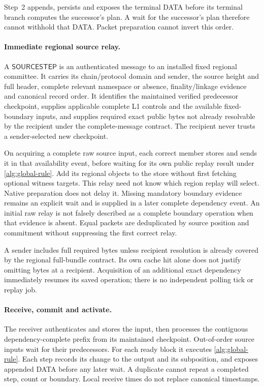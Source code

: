 \documentclass[11pt,a4paper]{article}
\newcommand{\tagg}[1]{\ensuremath{\mathsf{#1}}}
\newcounter{protocol}
\begin{document}
Step~2 appends, persists and exposes the terminal DATA before its
terminal branch computes the successor's plan. A wait for the successor's
plan therefore cannot withhold that DATA. Packet preparation cannot
invert this order.

\paragraph{Immediate regional source relay.}
A \tagg{SOURCESTEP} is an authenticated message to an installed fixed
regional committee. It carries its chain/protocol domain and sender,
the source height and full header, complete relevant namespace or
absence, finality/linkage evidence and canonical record order. It
identifies the maintained verified predecessor checkpoint, supplies
applicable complete L1 controls and the available fixed-boundary
inputs, and supplies required exact public bytes not already resolvable
by the recipient under the complete-message contract. The
recipient never trusts a sender-selected new checkpoint.

On acquiring a complete raw source input, each correct member stores
and sends it in that availability event, before waiting for its own
public replay result under \cref{alg:global-rule}. Add its regional objects to the store
without first fetching optional witness targets. This relay
need not know which region replay will select. Native preparation does
not delay it. Missing mandatory boundary evidence remains an explicit
wait and is supplied in a later complete dependency event. An initial
raw relay is not falsely described as a complete boundary operation
when that evidence is absent. Equal packets are deduplicated by source
position and commitment without suppressing the first correct relay.

A sender includes full required bytes unless recipient resolution is
already covered by the regional full-bundle contract. Its own cache hit
alone does not justify omitting bytes at a recipient. Acquisition of an
additional exact dependency immediately resumes its saved operation;
there is no independent polling tick or replay job.

\paragraph{Receive, commit and activate.}
The receiver authenticates and stores the input, then processes the
contiguous dependency-complete prefix from its maintained checkpoint.
Out-of-order source inputs wait for their predecessors. For each ready
block it executes \cref{alg:global-rule}. Each step records its change to the output and
its subposition, and exposes appended DATA before any later wait. A
duplicate cannot repeat a completed step, count or boundary. Local
receive times do not replace canonical timestamps.
\end{document}
